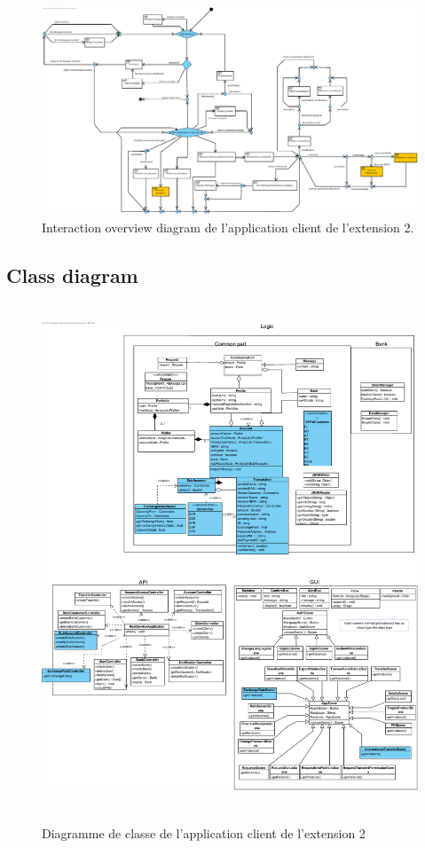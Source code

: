 \documentclass[]{report}
\begin{document}
\begin{figure}[h]
	\centering\includegraphics[width=\linewidth]{img/Interaction Overview Client - Extension 2.pdf}
	\caption{Interaction overview diagram de l'application client de l'extension 2.}
\end{figure}


\newpage

\subsection{Class diagram}

\begin{figure}[h!]
	\hbox{
		\centering\includegraphics[scale=0.69]{img/Class Diagram Client - Extension 2.pdf}
	}
	\caption{Diagramme de classe de l'application client de l'extension 2}
\end{figure}
\end{document}
